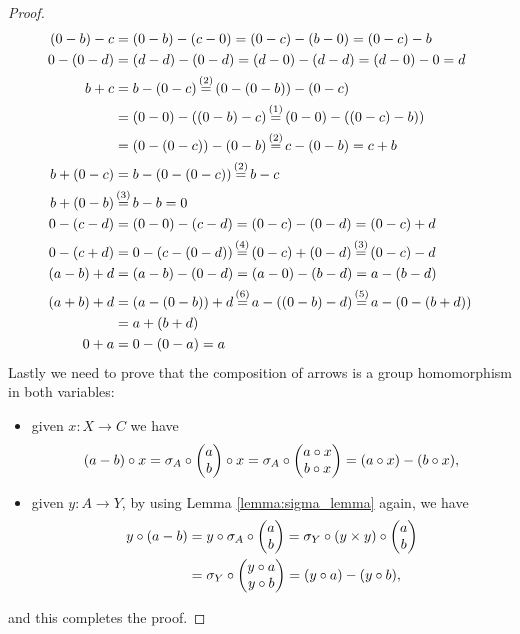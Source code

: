 \begin{proof}
  \begin{align}
    (0 - b) - c &= (0 - b) - (c - 0) = (0 - c) - (b - 0) = (0 - c) - b\\
    0 - (0 - d) &= (d - d) - (0 - d) = (d - 0) - (d - d) = (d - 0) - 0 = d\\
    b + c       &= b - (0 - c) \eqtext{(2)} (0 - (0 - b)) - (0 - c)\nonumber\\
                &= (0 - 0) - ((0 - b) - c) \eqtext{(1)} (0 - 0) - ((0 - c) -b))\nonumber\\
                &= (0 - (0 -c)) - (0 - b) \eqtext{(2)} c - (0 - b) = c + b\nonumber\\
    b + (0 - c) &= b - (0 - (0 - c)) \eqtext{(2)} b - c\\
    b + (0 - b) &\eqtext{(3)} b - b = 0\nonumber\\
    0 - (c - d) &= (0 - 0) - (c - d) = (0 - c) - (0 - d) = (0 - c) + d\\
    0 - (c + d) &= 0 - (c - (0 - d)) \eqtext{(4)} (0 - c) + (0 - d) \eqtext{(3)} (0 - c) - d\\
    (a - b) + d &= (a - b) - (0 - d) = (a - 0) - (b - d) = a - (b - d)\\
    (a + b) + d &= (a - (0 - b)) + d \eqtext{(6)} a - ((0 - b) - d) \eqtext{(5)} a - (0 - (b + d))\nonumber\\
                &= a + (b + d)\nonumber\\
    0 + a       &= 0 - (0 - a) = a\nonumber
  \end{align}
  Lastly we need to prove that the composition of arrows is a group homomorphism in both variables:
  \begin{itemize}
  \item given \(x\colon X\to C\) we have
    \begin{align*}
      (a - b)\circ x = \sigma_A\circ\begin{pmatrix}a\\ b\end{pmatrix}\circ x = \sigma_A\circ\begin{pmatrix}a\circ x\\ b\circ x\end{pmatrix} = (a\circ x) - (b\circ x),
    \end{align*}
  \item given \(y\colon A\to Y\), by using Lemma \ref{lemma:sigma_lemma} again, we have
    \begin{align*}
      y\circ(a - b) &= y\circ\sigma_A\circ\begin{pmatrix}a\\ b\end{pmatrix} = \sigma_Y\circ(y\times y)\circ\begin{pmatrix}a\\ b\end{pmatrix}\\
                    &= \sigma_Y\circ\begin{pmatrix}y\circ a\\ y\circ b\end{pmatrix} = (y\circ a) - (y\circ b),
    \end{align*}
  \end{itemize}
  and this completes the proof.
\end{proof}

